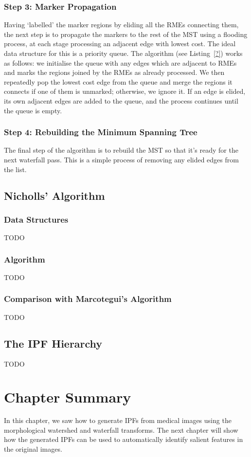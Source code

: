 \subsubsection{Step 3: Marker Propagation}

Having `labelled' the marker regions by eliding all the RMEs connecting them, the next step is to propagate the markers to the rest of the MST using a flooding process, at each stage processing an adjacent edge with lowest cost. The ideal data structure for this is a priority queue. The algorithm (see Listing~\ref{?}) works as follows: we initialise the queue with any edges which are adjacent to RMEs and marks the regions joined by the RMEs as already processed. We then repeatedly pop the lowest cost edge from the queue and merge the regions it connects if one of them is unmarked; otherwise, we ignore it. If an edge is elided, its own adjacent edges are added to the queue, and the process continues until the queue is empty.

\subsubsection{Step 4: Rebuilding the Minimum Spanning Tree}

The final step of the algorithm is to rebuild the MST so that it's ready for the next waterfall pass. This is a simple process of removing any elided edges from the list.

\subsection{Nicholls' Algorithm}

\subsubsection{Data Structures}

TODO

\subsubsection{Algorithm}

TODO

\subsubsection{Comparison with Marcotegui's Algorithm}

TODO

\subsection{The IPF Hierarchy}

TODO

\fi

\section{Chapter Summary}

In this chapter, we saw how to generate IPFs from medical images using the morphological watershed and waterfall transforms. The next chapter will show how the generated IPFs can be used to automatically identify salient features in the original images.
